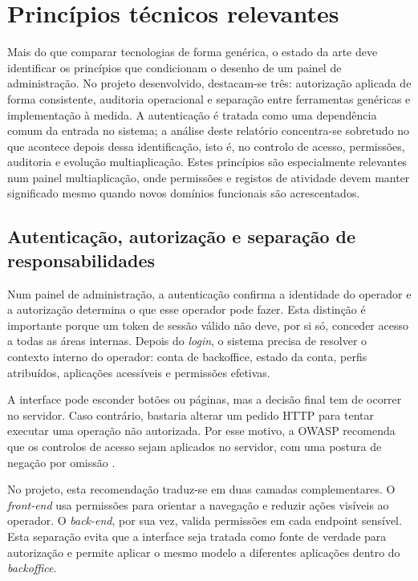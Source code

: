 
\section{Princípios técnicos relevantes}
\label{sec:principios_tecnicos_relevantes}

Mais do que comparar tecnologias de forma genérica, o estado da arte deve identificar os princípios que condicionam o desenho de um painel de administração. No projeto desenvolvido, destacam-se três: autorização aplicada de forma consistente, auditoria operacional e separação entre ferramentas genéricas e implementação à medida. A autenticação é tratada como uma dependência comum da entrada no sistema; a análise deste relatório concentra-se sobretudo no que acontece depois dessa identificação, isto é, no controlo de acesso, permissões, auditoria e evolução multiaplicação. Estes princípios são especialmente relevantes num painel multiaplicação, onde permissões e registos de atividade devem manter significado mesmo quando novos domínios funcionais são acrescentados.

\subsection{Autenticação, autorização e separação de responsabilidades}

Num painel de administração, a autenticação confirma a identidade do operador e a autorização determina o que esse operador pode fazer. Esta distinção é importante porque um token de sessão válido não deve, por si só, conceder acesso a todas as áreas internas. Depois do \textit{login}, o sistema precisa de resolver o contexto interno do operador: conta de backoffice, estado da conta, perfis atribuídos, aplicações acessíveis e permissões efetivas.

A interface pode esconder botões ou páginas, mas a decisão final tem de ocorrer no servidor. Caso contrário, bastaria alterar um pedido \gls{HTTP} para tentar executar uma operação não autorizada. Por esse motivo, a OWASP recomenda que os controlos de acesso sejam aplicados no servidor, com uma postura de negação por omissão \cite{OWASPAuthorizationCheatSheet}.

No projeto, esta recomendação traduz-se em duas camadas complementares. O \textit{front-end} usa permissões para orientar a navegação e reduzir ações visíveis ao operador. O \textit{back-end}, por sua vez, valida permissões em cada endpoint sensível. Esta separação evita que a interface seja tratada como fonte de verdade para autorização e permite aplicar o mesmo modelo a diferentes aplicações dentro do \textit{backoffice}.

